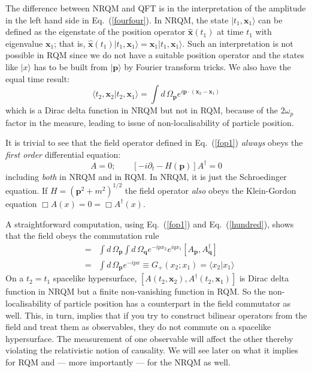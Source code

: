 \documentclass{article}
\def\eq#1{{Eq.~(\ref{#1})}}
\def\ket#1{|#1\rangle}                    %
\def\amp#1#2{\langle #1 | #2\rangle}      %
\begin{document}
 The  difference between NRQM and QFT is in the interpretation of the amplitude in the left hand side in \eq{fourfour}. In NRQM, the state $\ket{t_1,\bm{x}_1}$ can be defined as the eigenstate of the position operator $\bm{\hat{x}}(t_1)$ at time $t_1$ with eigenvalue $\bm{x}_1$; that is, $\bm{\hat{x}}(t_1)\ket{t_1,\bm{x}_1}=
 \bm{x}_1 \ket{t_1,\bm{x}_1}$. Such an interpretation is not possible in RQM since we do not have a suitable position operator and the states like $\ket{x}$ has to be built from $\ket{\bm{p}}$ by Fourier transform tricks. We also have the equal time result:
 \begin{equation}
  \amp{t_2,\bm{x}_2}{t_2,\bm{x}_1}=\int d\,\Omega_{\bm{p}}e^{i\bm{p}\cdot(\bm{x}_2-\bm{x}_1)}
  \end{equation} 
 which is a Dirac delta function in NRQM but not in RQM, because of the $2\omega_p$ factor in the measure, leading to issue of
 non-localisability of particle position. 
 
 It is trivial to see that the field operator defined in \eq{fop1} \textit{always} obeys the \textit{first order} differential equation:
 \begin{equation}
  [i\partial_t-H(\bm{p})]A=0;\qquad  [-i\partial_t-H(\bm{p})]A^\dagger=0
 \end{equation} 
  including \textit{both} in NRQM and in RQM.  In NRQM, it is just the Schroedinger equation. If $H=(\bm{p}^2+m^2)^{1/2}$ the field operator \textit{also} obeys the Klein-Gordon equation $\Box A(x) = 0 = \Box A^\dagger(x)$. 
  
 
  A straightforward computation, using \eq{fop1} and \eq{hundred}, shows that the field obeys the commutation rule 
\begin{eqnarray}
 [A(x_2), A^\dagger(x_1)] &=& \int d\,\Omega_{\bm{p}}\int d\,\Omega_{\bm{q}} e^{-ipx_2}e^{iqx_1}[A_{\bm{p}},A^\dagger_{\bm{q}}]\nonumber\\
&=& \int d\,\Omega_{\bm{p}}e^{-ipx} \equiv G_+(x_2;x_1) =\amp{x_2}{x_1}
\label{hundredthree}
\end{eqnarray}
 On a $t_2=t_1$ spacelike hypersurface, 
$[A(t_2,\bm{x}_2), A^\dagger(t_2,\bm{x}_1)]$ is Dirac delta function in NRQM but a finite non-vanishing function in RQM. So the non-localisability of particle position has a counterpart in the field commutator as well. This, in turn, implies that if you try to construct bilinear operators from the field
and treat them as observables, they do not commute on a spacelike hypersurface. The measurement of one observable will affect the other thereby violating the relativistic notion of causality. We will see later on what it implies for RQM and --- more importantly --- for the NRQM as well.
\end{document}
